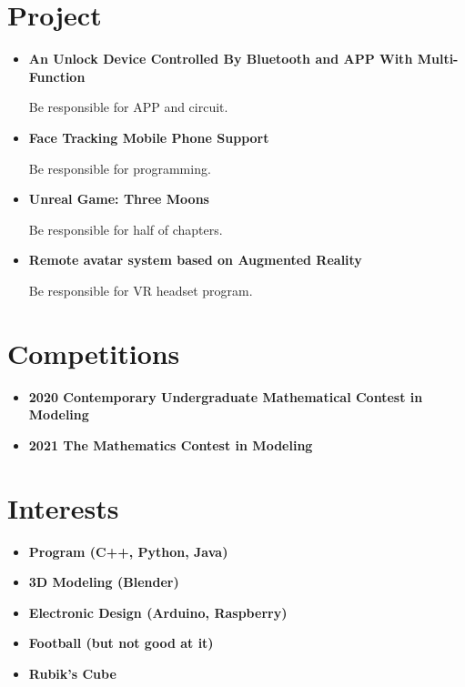 \documentclass{article}
\begin{document}
\section*{Project}
\begin{itemize}
    \item {\bf An Unlock Device Controlled By Bluetooth and APP With Multi-Function} \\
        \rule{0mm}{5mm}Be responsible for APP and circuit.
    \item {\bf Face Tracking Mobile Phone Support} \\
        \rule{0mm}{5mm}Be responsible for programming.
    \item {\bf Unreal Game: Three Moons} \\
        \rule{0mm}{5mm}Be responsible for half of chapters.
    \item {\bf Remote avatar system based on Augmented Reality} \\
        \rule{0mm}{5mm}Be responsible for VR headset program.
\end{itemize}


\section*{Competitions}
\begin{itemize}
    \item {\bf 2020 Contemporary Undergraduate Mathematical Contest in Modeling}
    \item {\bf 2021 The Mathematics Contest in Modeling}
\end{itemize}


\section*{Interests}
\begin{itemize}
    \item {\bf Program (C++, Python, Java)}
    \item {\bf 3D Modeling (Blender)}
    \item {\bf Electronic Design (Arduino, Raspberry)}
    \item {\bf Football (but not good at it)}
    \item {\bf Rubik's Cube}
\end{itemize}
\end{document}
